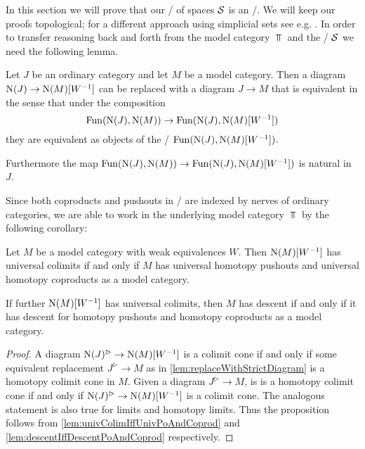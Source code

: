 In this section we will prove that our \inftycat/ of spaces $\mathcal{S}$ is an \inftytop/.
We will keep our proofs topological; for a different approach using simplicial sets see e.g. \cite[\S 6]{HTT}.
In order to transfer reasoning back and forth from the model category $\Top$ and the \inftycat/ $\mathcal{S}$ we need the following lemma.
\begin{lemma}\label{lem:replaceWithStrictDiagram} %
    Let $J$ be an ordinary category and let $M$ be a model category.
    Then a diagram $\operatorname{N}(J)\to\operatorname{N}(M)[W^{-1}]$ can be replaced with a diagram $J\to M$ that is equivalent in the sense that under the composition
    \begin{equation*}
        \Fun(\N(J),\N(M))\to\Fun(\N(J),\N(M)[W^{-1}]) %
    \end{equation*} 
    they are equivalent as objects of the \inftycat/ $\operatorname{Fun}(\operatorname{N}(J),\operatorname{N}(M)[W^{-1}])$.

    Furthermore the map $\operatorname{Fun}(\operatorname{N}(J),\operatorname{N}(M))\to\operatorname{Fun}(\operatorname{N}(J),\operatorname{N}(M)[W^{-1}])$ is natural in $J$.
    \begin{reference}
        \cite[Proposition 1.3.4.25]{higher_algebra}
    \end{reference}
\end{lemma}
Since both coproducts and pushouts in \inftycats/ are indexed by nerves of ordinary categories, we are able to work in the underlying model category $\Top$ by the following corollary:
\begin{corollary}\label{cor:sufficientToProveInModCat}
    Let $M$ be a model category with weak equivalences $W$. 
    Then $\operatorname{N}(M)[W^{-1}]$ has universal colimits if and only if $M$ has universal homotopy pushouts and universal homotopy coproducts as a model category.
    
    If further $\operatorname{N}(M)[W^{-1}]$ has universal colimits, then $M$ has descent if and only if it has descent for homotopy pushouts and homotopy coproducts as a model category.
    \begin{proof}
        A diagram $\operatorname{N}(J)^{\rhd}\to\operatorname{N}(M)[W^{-1}]$ is a colimit cone if and only if some equivalent replacement $J^{\rhd}\to M$ as in \cref{lem:replaceWithStrictDiagram} is a homotopy colimit cone in $M$.
        Given a diagram $J^{\rhd}\to M$, is is a homotopy colimit cone if and only if $\operatorname{N}(J)^{\rhd}\to\operatorname{N}(M)[W^{-1}]$ is a colimit cone.
        The analogous statement is also true for limits and homotopy limits.
        Thus the proposition follows from \cref{lem:univColimIffUnivPoAndCoprod} and \cref{lem:descentIffDescentPoAndCoprod} respectively.
    \end{proof}
\end{corollary}
